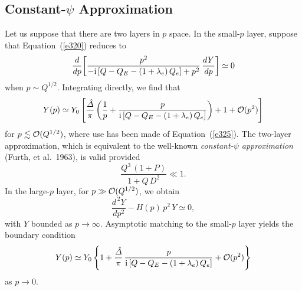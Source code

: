 \documentclass[notitlepage,12pt]{article}
\begin{document}
\subsection{Constant-$\psi$ Approximation}\label{s5.6}
Let us suppose that there are two layers in $p$ space. In the small-$p$ layer, suppose that Equation~(\ref{e320}) reduces to
\begin{equation}
\frac{d}{dp}\!\left[\frac{p^2}{-{\rm i}\,[Q-Q_E-(1+\lambda_e)\,Q_e] + p^2}\,\frac{dY}{dp}\right]\simeq 0
\end{equation}
when $p\sim Q^{1/2}$. Integrating directly, we find that
\begin{equation}
Y(p) \simeq Y_0 \left[\frac{\hat{\mit\Delta}}{\pi}\left(\frac{1}{p} + \frac{p}{{\rm i}\,[Q-Q_E-(1+\lambda_e)\,Q_e]}\right) + 1 + {\cal O}(p^2)\right]
\end{equation}
for $p\lesssim {\cal O}(Q^{1/2})$, where use has been made of Equation~(\ref{e325}). The two-layer  approximation, which is
equivalent to the well-known {\em constant-$\psi$ approximation}\/ (Furth, et al.\ 1963), is valid provided
\begin{equation}
\frac{Q^3\,(1+P)}{1+Q\,D^2}\ll 1.
\end{equation}
In the large-$p$ layer, for  $p\gg {\cal O}(Q^{1/2})$, we obtain 
\begin{equation}\label{e329}
\frac{d^{\,2} Y}{dp^2} - H(p)\,p^2\,Y\simeq 0,
\end{equation}
with $Y$ bounded as $p\rightarrow \infty$. Asymptotic matching to the small-$p$ layer yields the boundary
condition 
\begin{equation}\label{e330}
Y(p)\simeq Y_0\left\{1+ \frac{\hat{\mit\Delta}}{\pi}\,\frac{p}{{\rm i}\,[Q-Q_E-(1+\lambda_e)\,Q_e]}+ {\cal O}(p^2)\right\}
\end{equation}
as $p\rightarrow 0$. 
\end{document}
